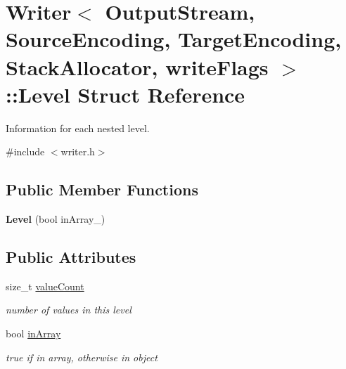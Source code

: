 \hypertarget{a00190}{}\section{Writer$<$ Output\+Stream, Source\+Encoding, Target\+Encoding, Stack\+Allocator, write\+Flags $>$\+:\+:Level Struct Reference}
\label{a00190}


Information for each nested level.  




{\ttfamily \#include $<$writer.\+h$>$}

\subsection*{Public Member Functions}
\begin{DoxyCompactItemize}
\item 
{\bfseries Level} (bool in\+Array\+\_\+)\hypertarget{a00190_a0b1844a7a1b7c6c20e1964dbb67da484}{}\label{a00190_a0b1844a7a1b7c6c20e1964dbb67da484}

\end{DoxyCompactItemize}
\subsection*{Public Attributes}
\begin{DoxyCompactItemize}
\item 
size\+\_\+t \hyperlink{a00190_a4a09e5fda49d0d57b2adc041203f244f}{value\+Count}\hypertarget{a00190_a4a09e5fda49d0d57b2adc041203f244f}{}\label{a00190_a4a09e5fda49d0d57b2adc041203f244f}

\begin{DoxyCompactList}\small\item\em number of values in this level \end{DoxyCompactList}\item 
bool \hyperlink{a00190_aa009a2d675e98757c2997072aad78789}{in\+Array}\hypertarget{a00190_aa009a2d675e98757c2997072aad78789}{}\label{a00190_aa009a2d675e98757c2997072aad78789}

\begin{DoxyCompactList}\small\item\em true if in array, otherwise in object \end{DoxyCompactList}\end{DoxyCompactItemize}


